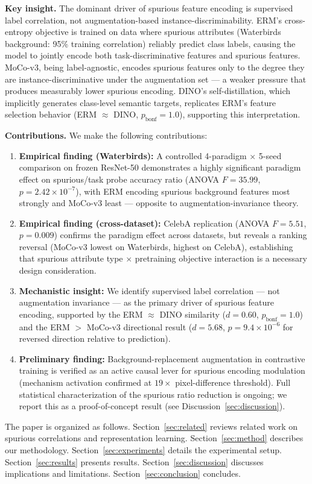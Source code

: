 \textbf{Key insight.} The dominant driver of spurious feature encoding is supervised label correlation, not augmentation-based instance-discriminability. ERM's cross-entropy objective is trained on data where spurious attributes (Waterbirds background: 95\% training correlation) reliably predict class labels, causing the model to jointly encode both task-discriminative features and spurious features. MoCo-v3, being label-agnostic, encodes spurious features only to the degree they are instance-discriminative under the augmentation set --- a weaker pressure that produces measurably lower spurious encoding. DINO's self-distillation, which implicitly generates class-level semantic targets, replicates ERM's feature selection behavior (ERM $\approx$ DINO, $p_\text{bonf} = 1.0$), supporting this interpretation.

\textbf{Contributions.} We make the following contributions:

\begin{enumerate}
\item \textbf{Empirical finding (Waterbirds):} A controlled 4-paradigm $\times$ 5-seed comparison on frozen ResNet-50 demonstrates a highly significant paradigm effect on spurious/task probe accuracy ratio (ANOVA $F = 35.99$, $p = 2.42 \times 10^{-7}$), with ERM encoding spurious background features most strongly and MoCo-v3 least --- opposite to augmentation-invariance theory.

\item \textbf{Empirical finding (cross-dataset):} CelebA replication (ANOVA $F = 5.51$, $p = 0.009$) confirms the paradigm effect across datasets, but reveals a ranking reversal (MoCo-v3 lowest on Waterbirds, highest on CelebA), establishing that spurious attribute type $\times$ pretraining objective interaction is a necessary design consideration.

\item \textbf{Mechanistic insight:} We identify supervised label correlation --- not augmentation invariance --- as the primary driver of spurious feature encoding, supported by the ERM $\approx$ DINO similarity ($d = 0.60$, $p_\text{bonf} = 1.0$) and the ERM $>$ MoCo-v3 directional result ($d = 5.68$, $p = 9.4 \times 10^{-6}$ for reversed direction relative to prediction).

\item \textbf{Preliminary finding:} Background-replacement augmentation in contrastive training is verified as an active causal lever for spurious encoding modulation (mechanism activation confirmed at $19\times$ pixel-difference threshold). Full statistical characterization of the spurious ratio reduction is ongoing; we report this as a proof-of-concept result (see Discussion~\ref{sec:discussion}).
\end{enumerate}

The paper is organized as follows. Section~\ref{sec:related} reviews related work on spurious correlations and representation learning. Section~\ref{sec:method} describes our methodology. Section~\ref{sec:experiments} details the experimental setup. Section~\ref{sec:results} presents results. Section~\ref{sec:discussion} discusses implications and limitations. Section~\ref{sec:conclusion} concludes.
